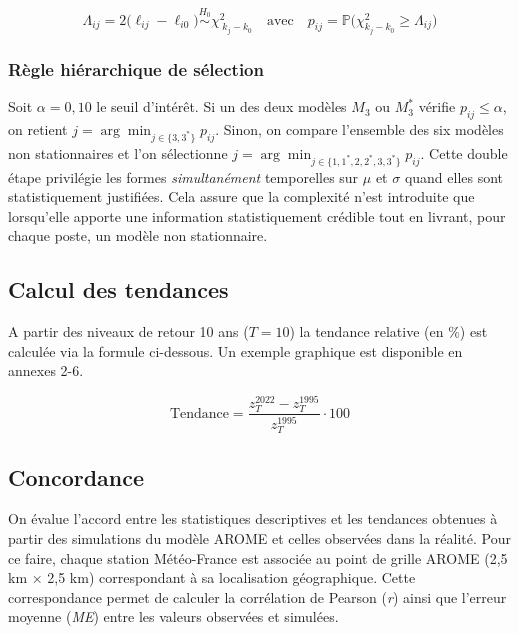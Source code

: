 \documentclass[
  article,
  nofooter,
  noheadings]{jss}
\begin{document}
\[
\Lambda_{ij}=2\bigl(\ell_{ij}-\ell_{i0}\bigr) \overset{H_0}{\sim}\chi^{2}_{\;k_j-k_0} \quad \text{avec} \quad p_{ij}= \mathbb{P}(\chi^{2}_{k_j-k_0}\ge \Lambda_{ij}\bigr)
\]

\subsubsection{Règle hiérarchique de
sélection}\label{ruxe8gle-hiuxe9rarchique-de-suxe9lection}

Soit \(\alpha=0{,}10\) le seuil d'intérêt. Si un des deux modèles
\(M_3\) ou \(M_3^\ast\) vérifie \(p_{ij}\le\alpha\), on retient
\(j=\arg\min_{j\in\{3,3^\ast\}} p_{ij}\). Sinon, on compare l'ensemble
des six modèles non stationnaires et l'on sélectionne
\(j=\arg\min_{j\in\{1,1^\ast,2,2^\ast,3,3^\ast\}} p_{ij}\). Cette double
étape privilégie les formes \emph{simultanément} temporelles sur \(\mu\)
et \(\sigma\) quand elles sont statistiquement justifiées. Cela assure
que la complexité n'est introduite que lorsqu'elle apporte une
information statistiquement crédible tout en livrant, pour chaque poste,
un modèle non stationnaire.

\subsection{Calcul des tendances}\label{calcul-des-tendances}

A partir des niveaux de retour 10 ans (\(T = 10\)) la tendance relative
(en \%) est calculée via la formule ci-dessous. Un exemple graphique est
disponible en annexes 2-6.

\begin{tcolorbox}[enhanced jigsaw, toprule=.15mm, bottomrule=.15mm, colback=white, breakable, left=2mm, leftrule=.75mm, colframe=quarto-callout-color-frame, arc=.35mm, rightrule=.15mm, opacityback=0]

\[
\text{Tendance} = \frac{z_T^{2022} - z_T^{1995}}{z_T^{1995}} \cdot {100}
\]

\end{tcolorbox}

\subsection{Concordance}\label{concordance}

On évalue l'accord entre les statistiques descriptives et les tendances
obtenues à partir des simulations du modèle AROME et celles observées
dans la réalité. Pour ce faire, chaque station Météo-France est associée
au point de grille AROME (2,5 km × 2,5 km) correspondant à sa
localisation géographique. Cette correspondance permet de calculer la
corrélation de Pearson (\emph{r}) ainsi que l'erreur moyenne (\emph{ME})
entre les valeurs observées et simulées.
\end{document}
